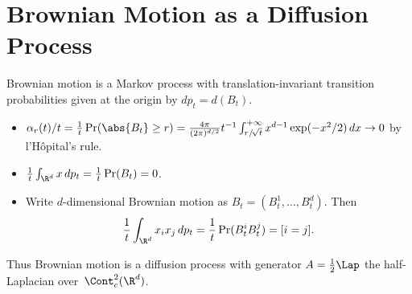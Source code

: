 \section	{Brownian Motion as a Diffusion Process}

Brownian motion is a Markov process
with translation-invariant transition probabilities given at the origin by
\( dp_t = d(B_t) \).
\begin	{itemize}
\item	\( \alpha_r(t)/t = \frac1t\Pr(\abs{B_t}\ge r)
	= \frac{4\pi}{(2\pi)^{d/2}} t^{-1} \int_{r/\!\sqrt t}^{+\infty}
		x^{d-1} \exp(-x^2/2) \,dx
	\to 0 \)
	by l'Hôpital's rule.
\item	\( \frac1t \int_{\R^d} x\,dp_t = \frac1t \Pr(B_t) = 0 \).
\item	Write $d$\nobreakdash-dimensional Brownian motion as
	\( B_t = (B^1_t,\dots,B^d_t) \).
	Then
	\begin	{equation*}
		\frac1t \int_{\R^d} x_i x_j \,dp_t
		=	\frac1t \Pr(B^i_t B^j_t)
		=	[i=j] \text.
	\end	{equation*}
\end	{itemize}
Thus Brownian motion is a diffusion process
with generator \( A = \frac12\Lap \) the half-Laplacian over~$\Cont^2_c(\R^d)$.
